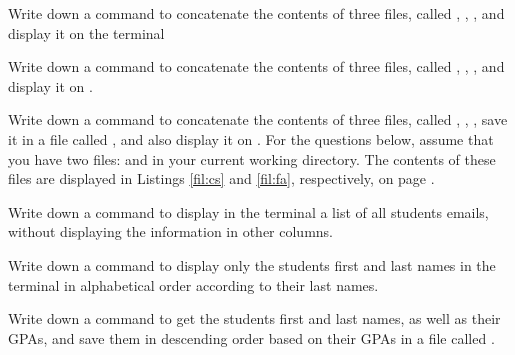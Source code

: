 \begin{exercises}
  \item Write down a command to concatenate the contents of three files, called , , , and display it on the terminal
  \item Write down a command to concatenate the contents of three files, called , , , and display it on .
  \item Write down a command to concatenate the contents of three files, called , , , save it in a file called , and also display it on .
  \newline
  \newline
  For the questions below, assume that you have two files:  and  in your current working directory. The contents of these files are displayed in Listings \ref{fil:cs} and \ref{fil:fa}, respectively, on page \pageref{fil:fa}.
  \item Write down a command to display in the terminal a list of all students emails, without displaying the information in other columns.
  \item Write down a command to display only the students first and last names in the terminal in alphabetical order according to their last names.
  \item Write down a command to get the students first and last names, as well as their GPAs, and save them in descending order based on their GPAs in a file called .
\end{exercises}
